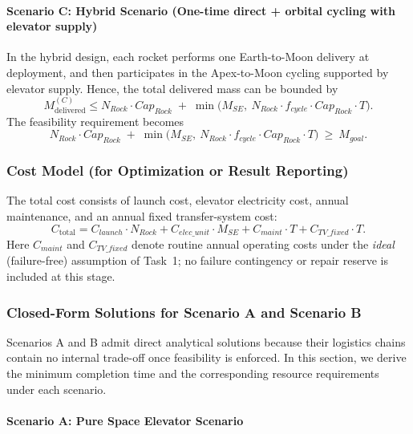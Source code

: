 ﻿\documentclass{mcmthesis}
\begin{document}
\paragraph{Scenario C: Hybrid Scenario (One-time direct + orbital cycling with elevator supply)}
In the hybrid design, each rocket performs one Earth-to-Moon delivery at deployment,
and then participates in the Apex-to-Moon cycling supported by elevator supply.
Hence, the total delivered mass can be bounded by
\begin{equation}
M_{\mathrm{delivered}}^{(C)} \le N_{Rock}\cdot Cap_{Rock} 
\;+\; \min\Big(M_{SE},\ N_{Rock}\cdot f_{cycle}\cdot Cap_{Rock}\cdot T \Big).
\end{equation}
The feasibility requirement becomes
\begin{equation}
N_{Rock}\cdot Cap_{Rock} 
\;+\; \min\Big(M_{SE},\ N_{Rock}\cdot f_{cycle}\cdot Cap_{Rock}\cdot T \Big)
\ \ge\ M_{goal}.
\end{equation}

\subsubsection{Cost Model (for Optimization or Result Reporting)}
The total cost consists of launch cost, elevator electricity cost, annual maintenance, and
an annual fixed transfer-system cost:
\begin{equation}
C_{\mathrm{total}} 
= C_{launch}\cdot N_{Rock} 
+ C_{elec\_unit}\cdot M_{SE}
+ C_{maint}\cdot T
+ C_{TV\_fixed}\cdot T.
\end{equation}
Here $C_{maint}$ and $C_{TV\_fixed}$ denote routine annual operating costs under the \emph{ideal} (failure-free) assumption of Task~1; no failure contingency or repair reserve is included at this stage.

\subsubsection{Closed-Form Solutions for Scenario A and Scenario B}

Scenarios A and B admit direct analytical solutions because their logistics
chains contain no internal trade-off once feasibility is enforced. In this
section, we derive the minimum completion time and the corresponding resource
requirements under each scenario.

\paragraph{Scenario A: Pure Space Elevator Scenario}
\end{document}
